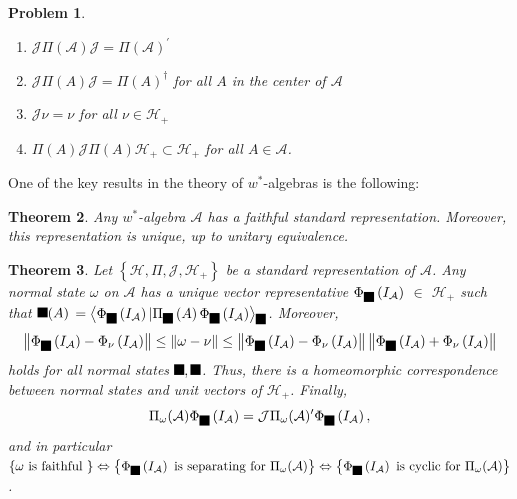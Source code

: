 \documentclass[aps,preprint]{revtex4}%
\providecommand{\U}[1]{\protect\rule{.1in}{.1in}}
\newtheorem{theorem}{Theorem}
\newtheorem{problem}[theorem]{Problem}
\begin{document}
\begin{problem}
\begin{enumerate}
\item $\mathcal{J}\Pi(\mathcal{A})\mathcal{J}=\Pi(\mathcal{A})^{\prime}$

\item $\mathcal{J}\Pi(A)\mathcal{J}=\Pi(A)^{\dagger}$ for all $A$ in the
center of $\mathcal{A}$

\item $\mathcal{J}\nu=\nu$ for all $\nu\in\mathcal{H}_{+}$

\item $\Pi(A)\mathcal{J}\Pi(A)\mathcal{H}_{+}\subset\mathcal{H}_{+}$ for all
$A\in\mathcal{A}$.
\end{enumerate}
\end{problem}

One of the key results in the theory of $w^{\ast}$-algebras is the following:

\begin{theorem}
\emph{Any} $w^{\ast}$-algebra $\mathcal{A}$ has a faithful standard
representation. Moreover, this representation is unique, up to unitary equivalence.
\end{theorem}

\begin{theorem}
Let $\left\{  \mathcal{H},\Pi,\mathcal{J},\mathcal{H}_{+}\right\}  $ be a
standard representation of $\mathcal{A}$. Any normal state $\omega$ on
$\mathcal{A}$ has a unique vector representative $\Phi_{\U{3c9} }\left(
I_{\mathcal{A}}\right)  $ $\in$ $\mathcal{H}_{+}$ such that $\U{3c9} (A)$
$=\left\langle \Phi_{\U{3c9} }\left(  I_{\mathcal{A}}\right)  |\Pi_{\U{3c9}
}\left(  A\right)  \Phi_{\U{3c9} }\left(  I_{\mathcal{A}}\right)
\right\rangle _{\U{3c9} }$. Moreover,%
\begin{equation}
\left\Vert \Phi_{\U{3c9} }\left(  I_{\mathcal{A}}\right)  -\Phi_{\nu}\left(
I_{\mathcal{A}}\right)  \right\Vert \leq\left\Vert \omega-\nu\right\Vert
\leq\left\Vert \Phi_{\U{3c9} }\left(  I_{\mathcal{A}}\right)  -\Phi_{\nu
}\left(  I_{\mathcal{A}}\right)  \right\Vert \left\Vert \Phi_{\U{3c9} }\left(
I_{\mathcal{A}}\right)  +\Phi_{\nu}\left(  I_{\mathcal{A}}\right)
\right\Vert
\end{equation}
holds for all normal states $\U{3c9} ,\U{3bd} $. Thus, there is a
\emph{homeomorphic correspondence} between \emph{normal states and unit
vectors} of $\mathcal{H}_{+}$. Finally,%
\begin{equation}
\Pi_{\omega}(\mathcal{A})\Phi_{\U{3c9} }\left(  I_{\mathcal{A}}\right)
=\mathcal{J}\Pi_{\omega}(\mathcal{A})^{\prime}\Phi_{\U{3c9} }\left(
I_{\mathcal{A}}\right)  ,
\end{equation}
and in particular $\left\{  \omega\text{ is faithful }\right\}
\Leftrightarrow\left\{  \Phi_{\U{3c9} }\left(  I_{\mathcal{A}}\right)  \text{
is separating for }\Pi_{\omega}(\mathcal{A})\right\}  \Leftrightarrow\left\{
\Phi_{\U{3c9} }\left(  I_{\mathcal{A}}\right)  \text{ is cyclic for }%
\Pi_{\omega}(\mathcal{A})\right\}  $.
\end{theorem}
\end{document}
